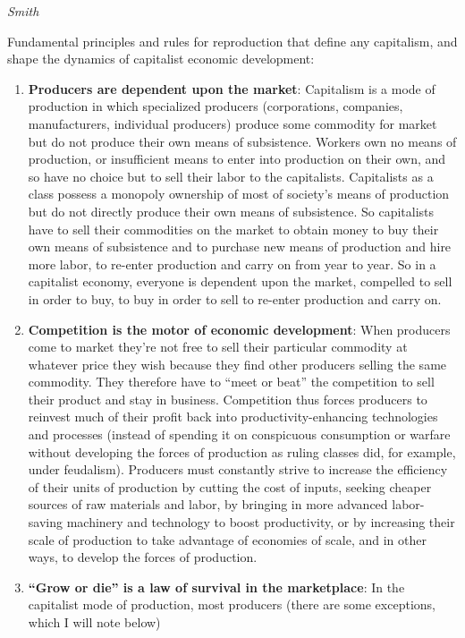 \documentclass[
]{book}
\begin{document}
\emph{Smith}

Fundamental principles and rules for reproduction that define any capitalism,
and shape the dynamics of capitalist economic development:

\begin{enumerate}
\def\labelenumi{\arabic{enumi}.}
\item
  \textbf{Producers are dependent upon the market}: Capitalism is a mode of production
  in which specialized producers (corporations, companies, manufacturers, individual
  producers) produce some commodity for market but do not produce their own means
  of subsistence. Workers own no means of production, or insufficient means to enter
  into production on their own, and so have no choice but to sell their labor to the
  capitalists. Capitalists as a class possess a monopoly ownership of most of society's
  means of production but do not directly produce their own means of subsistence. So
  capitalists have to sell their commodities on the market to obtain money to buy their
  own means of subsistence and to purchase new means of production and hire more
  labor, to re-enter production and carry on from year to year. So in a capitalist
  economy, everyone is dependent upon the market, compelled to sell in order to buy,
  to buy in order to sell to re-enter production and carry on.
\item
  \textbf{Competition is the motor of economic development}: When producers come to
  market they're not free to sell their particular commodity at whatever price they
  wish because they find other producers selling the same commodity. They therefore
  have to ``meet or beat'' the competition to sell their product and stay in business.
  Competition thus forces producers to reinvest much of their profit back into
  productivity-enhancing technologies and processes (instead of spending it on
  conspicuous consumption or warfare without developing the forces of production as
  ruling classes did, for example, under feudalism). Producers must constantly strive
  to increase the efficiency of their units of production by cutting the cost of inputs,
  seeking cheaper sources of raw materials and labor, by bringing in more advanced
  labor-saving machinery and technology to boost productivity, or by increasing their
  scale of production to take advantage of economies of scale, and in other ways, to
  develop the forces of production.
\item
  \textbf{``Grow or die'' is a law of survival in the marketplace}: In the capitalist mode
  of production, most producers (there are some exceptions, which I will note below)

\end{enumerate}
\end{document}

